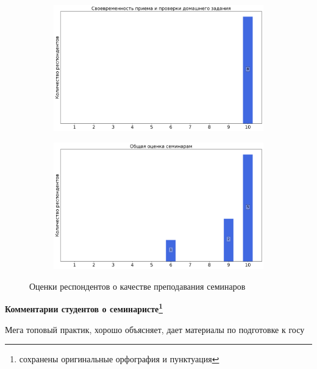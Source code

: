 \begin{figure}[H]
\begin{subfigure}[b]{0.45\textwidth}
                    \centering
                    \includegraphics[width=\textwidth]{images/3 course/Общая физика - квантовая физика/seminarists-marks-Кубышкин А.В.-2.png}
                \end{subfigure}
                \begin{subfigure}[b]{0.45\textwidth}
                    \centering
                    \includegraphics[width=\textwidth]{images/3 course/Общая физика - квантовая физика/seminarists-marks-Кубышкин А.В.-3.png}
                \end{subfigure}	
                \caption{Оценки респондентов о качестве преподавания семинаров}
            \end{figure}

            \textbf{Комментарии студентов о семинаристе\protect\footnote{сохранены оригинальные орфография и пунктуация}}
                \begin{commentbox} 
                    Мега топовый практик, хорошо объясняет, дает материалы по подготовке к госу 
                \end{commentbox} 
            
